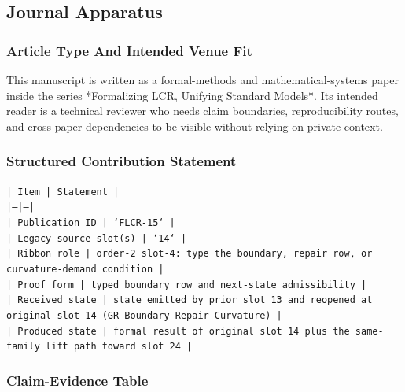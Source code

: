 \documentclass[11pt]{article}
\begin{document}
\subsection*{Journal Apparatus}

\subsubsection*{Article Type And Intended Venue Fit}

This manuscript is written as a formal-methods and mathematical-systems paper
inside the series *Formalizing LCR, Unifying Standard Models*. Its intended
reader is a technical reviewer who needs claim boundaries, reproducibility
routes, and cross-paper dependencies to be visible without relying on private
context.

\subsubsection*{Structured Contribution Statement}

\noindent\texttt{| Item | Statement |}\\
\noindent\texttt{|---|---|}\\
\noindent\texttt{| Publication ID | `FLCR-15` |}\\
\noindent\texttt{| Legacy source slot(s) | `14` |}\\
\noindent\texttt{| Ribbon role | order-2 slot-4: type the boundary, repair row, or curvature-demand condition |}\\
\noindent\texttt{| Proof form | typed boundary row and next-state admissibility |}\\
\noindent\texttt{| Received state | state emitted by prior slot 13 and reopened at original slot 14 (GR Boundary Repair Curvature) |}\\
\noindent\texttt{| Produced state | formal result of original slot 14 plus the same-family lift path toward slot 24 |}\\

\subsubsection*{Claim-Evidence Table}
\end{document}
